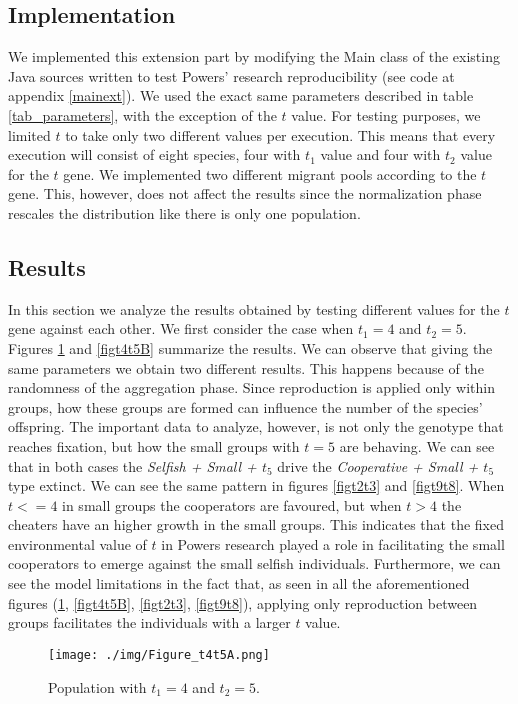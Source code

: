 \documentclass[runningheads]{llncs}
\begin{document}
\subsection{Implementation}
We implemented this extension part by modifying the Main class of the
existing Java sources written to test Powers' research
reproducibility (see code at appendix \ref{mainext}). We used the
exact same parameters described in table \ref{tab_parameters}, with the
exception of the $t$ value. For testing
purposes, we limited $t$ to take only two different values per
execution. This means that every execution will consist of eight species,
four with $t_1$ value and four with $t_2$ value for the $t$ gene. We
implemented two different migrant pools according to the $t$
gene. This, however, does not affect the results since the
normalization phase rescales the distribution like there is only one
population. 

\subsection{Results}
In this section we analyze the results obtained by testing different
values for the $t$ gene against each other. We first consider the case
when $t_1 = 4$ and $t_2 = 5$. Figures \ref{figt4t5A} and \ref{figt4t5B}
summarize the results. We can observe that giving the same parameters
we obtain two different results. This happens because of the
randomness of the aggregation phase. Since reproduction is applied
only within groups, how these groups are formed can influence the
number of the species' offspring. The important data to analyze,
however, is not only the genotype that reaches fixation, but how the small
groups with $t = 5$ are behaving. We can see that in both cases the
\textit{Selfish + Small + $t_5$} drive the \textit{Cooperative +
Small + $t_5$} type extinct. We can see the same pattern in figures
\ref{figt2t3} and \ref{figt9t8}. When $t <= 4$ in small groups the
cooperators are favoured, but when $t > 4$ the cheaters have an higher
growth in the small groups. This indicates that the fixed
environmental value of $t$ in Powers research played a role in
facilitating the small cooperators to emerge against the small selfish
individuals. Furthermore, we can see the model limitations in the fact
that, as seen in all the aforementioned figures (\ref{figt4t5A},
\ref{figt4t5B}, \ref{figt2t3}, \ref{figt9t8}), applying only
reproduction between groups facilitates the individuals with a larger
$t$ value.

\begin{figure}
\texttt{[image: ./img/Figure\_t4t5A.png]}
\caption{Population with $t_1 = 4$ and $t_2 = 5$.} \label{figt4t5A}
\end{figure}
\end{document}
